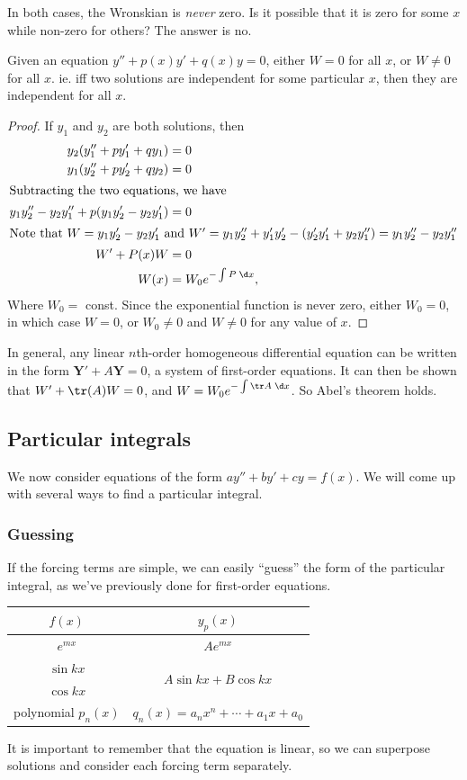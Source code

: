 \documentclass[a4paper]{article}
\begin{document}
In both cases, the Wronskian is \emph{never} zero. Is it possible that it is zero for some $x$ while non-zero for others? The answer is no.

\begin{thm}
  Given an equation $y'' + p(x)y' + q(x) y = 0$, either $W = 0$ for all $x$, or $W \not= 0$ for all $x$. ie. iff two solutions are independent for some particular $x$, then they are independent for all $x$.
\end{thm}

\begin{proof}
  If $y_1$ and $y_2$ are both solutions, then
  \begin{align*}
    y_2(y_1'' + py_1' + qy_1) &= 0\\
    y_1(y_2'' + py_2' + qy_2) &= 0\\
    \intertext{Subtracting the two equations, we have}
    y_1y_2'' - y_2y_1'' + p(y_1y_2' - y_2y_1') &= 0\\
    \intertext{Note that $W =y_1y_2' - y_2y_1'$ and $W' = y_1y_2'' + y_1'y_2' - (y_2'y_1' + y_2y_1'') = y_1y_2'' - y_2y_1''$}
    W' + P(x)W &= 0\\
    W(x) &= W_0 e^{-\int P\; \d x},
  \end{align*}
  Where $W_0 = $ const. Since the exponential function is never zero, either $W_0 = 0$, in which case $W = 0$, or $W_0 \not= 0$ and $W \not= 0$ for any value of $x$.
\end{proof}
In general, any linear $n$th-order homogeneous differential equation can be written in the form $\mathbf{Y}' + A\mathbf{Y} = 0$, a system of first-order equations. It can then be shown that $W' + \tr(A)W = 0$, and $W = W_0e^{-\int \tr A\;\d x}$. So Abel's theorem holds.

\subsection{Particular integrals}
We now consider equations of the form $ay'' + by' + cy = f(x)$. We will come up with several ways to find a particular integral.

\subsubsection{Guessing}
If the forcing terms are simple, we can easily ``guess'' the form of the particular integral, as we've previously done for first-order equations.
\begin{center}
  \begin{tabular}{cc}
    \toprule
    $f(x)$ & $y_p(x)$\\
    \midrule
    $e^{mx}$ & $Ae^{mx}$\\
    $\sin kx$ & \multirow{2}{*}{$A\sin kx + B\cos kx$}\\
    $\cos kx$ & \\
    polynomial $p_n(x)$ & $q_n(x) = a_nx^n + \cdots + a_1x + a_0$\\
    \bottomrule
  \end{tabular}
\end{center}
It is important to remember that the equation is linear, so we can superpose solutions and consider each forcing term separately.
\end{document}
